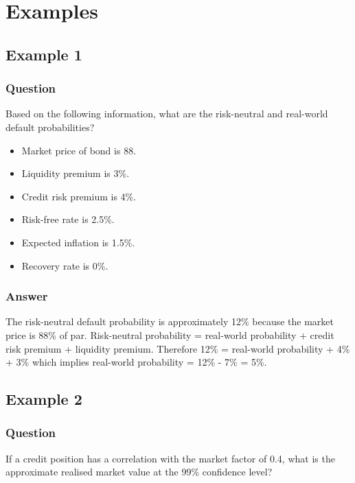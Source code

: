 \chapter{Examples}

\section{Example 1}

\subsection{Question}
Based on the following information, what are the risk-neutral and real-world default probabilities?
\begin{itemize}
	\item Market price of bond is 88.
	\item Liquidity premium is 3\%.
	\item Credit risk premium is 4\%.
	\item Risk-free rate is 2.5\%.
	\item Expected inflation is 1.5\%.
	\item Recovery rate is 0\%.
\end{itemize}

\subsection{Answer}
The risk-neutral default probability is approximately 12\% because the market price is 88\% of par. Risk-neutral probability = real-world probability + credit risk premium + liquidity premium. Therefore 12\% = real-world probability + 4\% + 3\% which implies real-world probability = 12\% - 7\% = 5\%.

\section{Example 2}

\subsection{Question}
If a credit position has a correlation with the market factor of 0.4, what is the approximate realised market value at the 99\% confidence level?

